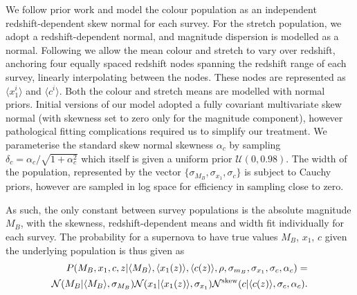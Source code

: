 \documentclass[a4paper,fleqn,usenatbib]{mnras}
\newcommand{\rubin}{\citetalias{Rubin2015}}
\begin{document}
We follow prior work and model the colour population as an independent redshift-dependent skew normal for each survey. For the stretch population, we adopt a redshift-dependent normal, and magnitude dispersion is modelled as a normal. Following {\rubin} we allow the mean colour and stretch to vary over redshift, anchoring four equally spaced redshift nodes spanning the redshift range of each survey, linearly interpolating between the nodes. These nodes are represented as $\langle x_1^i \rangle$ and $\langle c^i \rangle$. Both the colour and stretch means are modelled with normal priors. Initial versions of our model adopted a fully covariant multivariate skew normal (with skewness set to zero only for the magnitude component), however pathological fitting complications required us to simplify our treatment. We parameterise the standard skew normal skewness $\alpha_c$ by sampling $\delta_c = \alpha_c / \sqrt{1 + \alpha_c^2}$ which itself is given a uniform prior $\mathcal{U}(0,0.98)$. The width of the population, represented by the vector $\lbrace \sigma_{M_B}, \sigma_{x_1}, \sigma_c \rbrace$ is subject to Cauchy priors, however are sampled in log space for efficiency in sampling close to zero. 

As such, the only constant between survey populations is the absolute magnitude $M_B$, with the skewness, redshift-dependent means and width fit individually for each survey. The probability for a supernova to have true values $M_B$, $x_1$, $c$ given the underlying population is thus given as
\begin{align}
P(M_B, x_1, c, z | \langle M_B \rangle, \langle x_1(z) \rangle, \langle c(z) \rangle, \rho, \sigma_{m_B}, \sigma_{x_1}, \sigma_c, \alpha_c) = \notag \\
\mathcal{N}(M_B|\langle M_B \rangle, \sigma_{M_B}) \mathcal{N}(x_1 | \langle x_1(z) \rangle, \sigma_{x_1}) \mathcal{N}^{\rm{skew}}(c| \langle c(z) \rangle, \sigma_c, \alpha_c) \label{eq:l1}.
\end{align}
\end{document}
